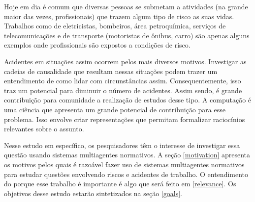 Hoje em dia é comum que diversas pessoas se submetam a atividades (na grande maior das vezes, profissionais) que trazem algum tipo de risco as suas vidas. Trabalhos como de eletricistas, bombeiros, área petroquímica, serviços de telecomunicações e de transporte (motoristas de ônibus, carro) são apenas alguns exemplos onde profissionais são  expostos a condições de risco.

Acidentes em situações assim ocorrem pelos mais diversos motivos. Investigar as cadeias de causalidade que resultam nessas situações podem trazer um entendimento de como lidar com circunstâncias assim. Consequentemente, isso traz um potencial para diminuir o número de acidentes. Assim sendo, é grande contribuição para comunidade a realização de estudos desse tipo. A computação é uma ciência que apresenta um grande potencial de contribuição para esse problema. Isso envolve criar representações que permitam formalizar raciocínios relevantes sobre o assunto.

Nesse estudo em específico, os pesquisadores têm o interesse de investigar essa questão usando sistemas multiagentes normativos. A seção \ref{motivation} apresenta os motivos pelos quais é razoável fazer uso de sistemas multiagentes normativos para estudar questões envolvendo riscos e acidentes de trabalho. O entendimento do porque 
esse trabalho é importante é algo que será feito em \ref{relevance}. Os objetivos desse estudo estarão sintetizados na seção \ref{goals}.